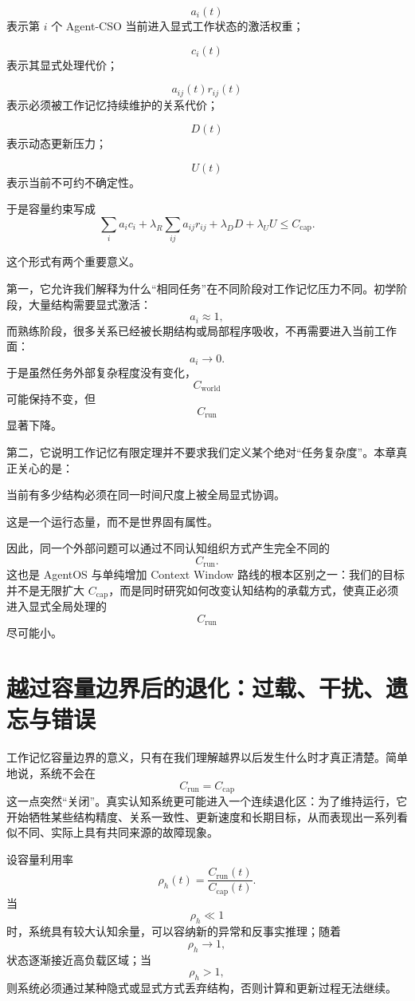 \[
a_i(t)
\]
表示第 $i$ 个 Agent-CSO 当前进入显式工作状态的激活权重；

\[
c_i(t)
\]
表示其显式处理代价；

\[
a_{ij}(t)r_{ij}(t)
\]
表示必须被工作记忆持续维护的关系代价；

\[
D(t)
\]
表示动态更新压力；

\[
U(t)
\]
表示当前不可约不确定性。

于是容量约束写成
\[
\boxed{
\sum_i a_ic_i
+
\lambda_R\sum_{ij}a_{ij}r_{ij}
+
\lambda_D D
+
\lambda_U U
\leq
C_{\mathrm{cap}}.
}
\]

这个形式有两个重要意义。

第一，它允许我们解释为什么“相同任务”在不同阶段对工作记忆压力不同。初学阶段，大量结构需要显式激活：
\[
a_i\approx1,
\]
而熟练阶段，很多关系已经被长期结构或局部程序吸收，不再需要进入当前工作面：
\[
a_i\rightarrow0.
\]
于是虽然任务外部复杂程度没有变化，
\[
C_{\mathrm{world}}
\]
可能保持不变，但
\[
C_{\mathrm{run}}
\]
显著下降。

第二，它说明工作记忆有限定理并不要求我们定义某个绝对“任务复杂度”。本章真正关心的是：
\begin{definition*}
当前有多少结构必须在同一时间尺度上被全局显式协调。
\end{definition*}
这是一个运行态量，而不是世界固有属性。

因此，同一个外部问题可以通过不同认知组织方式产生完全不同的
\[
C_{\mathrm{run}}.
\]
这也是 AgentOS 与单纯增加 Context Window 路线的根本区别之一：我们的目标并不是无限扩大 $C_{\mathrm{cap}}$，而是同时研究如何改变认知结构的承载方式，使真正必须进入显式全局处理的
\[
C_{\mathrm{run}}
\]
尽可能小。


\section{越过容量边界后的退化：过载、干扰、遗忘与错误}
\label{sec:overload-degradation}

工作记忆容量边界的意义，只有在我们理解越界以后发生什么时才真正清楚。简单地说，系统不会在
\[
C_{\mathrm{run}}=C_{\mathrm{cap}}
\]
这一点突然“关闭”。真实认知系统更可能进入一个连续退化区：为了维持运行，它开始牺牲某些结构精度、关系一致性、更新速度和长期目标，从而表现出一系列看似不同、实际上具有共同来源的故障现象。

设容量利用率
\[
\rho_h(t)
=
\frac{
C_{\mathrm{run}}(t)
}{
C_{\mathrm{cap}}(t)
}.
\]
当
\[
\rho_h\ll1
\]
时，系统具有较大认知余量，可以容纳新的异常和反事实推理；随着
\[
\rho_h\to1,
\]
状态逐渐接近高负载区域；当
\[
\rho_h>1,
\]
则系统必须通过某种隐式或显式方式丢弃结构，否则计算和更新过程无法继续。

